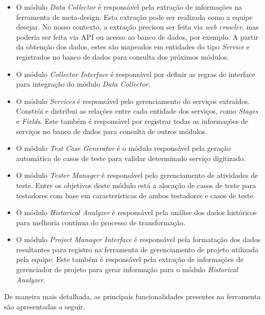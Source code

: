 \begin{itemize}
    \item O módulo \textit{Data Collector} é responsável pela extração de informações na ferramenta de meta-design. Esta extração pode ser realizada como a equipe desejar. No nosso contexto, a extração precisou ser feita via \textit{web crawler}, mas poderia ser feita via API ou acesso ao banco de dados, por exemplo. A partir da obtenção dos dados, estes são mapeados em entidades do tipo \textit{Service} e registrados no banco de dados para consulta dos próximos módulos. 
    
    \item O módulo \textit{Collector Interface} é responsável por definir as regras de interface para integração do módulo \textit{Data Collector}.
    
    \item O módulo \textit{Services} é responsável pelo gerenciamento do serviços extraídos. Constrói e distribui as relações entre cada entidade dos serviços, como \textit{Stages} e \textit{Fields}. Este também é responsável por registrar todas as informações de serviços no banco de dados para consulta de outros módulos.
    
    \item O módulo \textit{Test Case Generator} é o módulo responsável pela geração automática de casos de teste para validar determinado serviço digitizado.
    
    \item O módulo \textit{Tester Manager} é responsável pelo gerenciamento de atividades de teste. Entre os objetivos deste módulo está a alocação de casos de teste para testadores com base em características de ambos testadores e casos de teste.
    
    \item O módulo \textit{Historical Analyzer} é responsável pela análise dos dados históricos para melhoria contínua do processo de transformação. 
    
    \item O módulo \textit{Project Manager Interface} é responsável pela formatação dos dados resultantes para registro na ferramenta de gerenciamento de projeto utilizada pela equipe. Este também é responsável pela extração de informações de gerenciador de projeto para gerar informação para o módulo \textit{Historical Analyzer}.
\end{itemize}

De maneira mais detalhada, as principais funcionalidades presentes na ferramenta são apresentadas a seguir.

